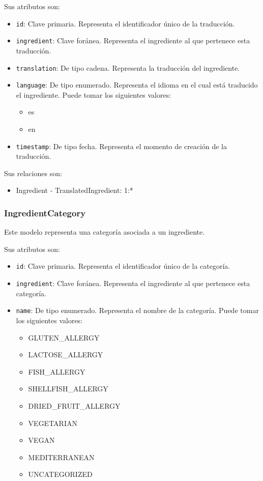 Sus atributos son:
\begin{itemize}
\item \texttt{id}: Clave primaria. Representa el identificador único de la
  traducción.
\item \texttt{ingredient}: Clave foránea. Representa el ingrediente al que
  pertenece esta traducción.
\item \texttt{translation}: De tipo cadena. Representa la traducción del
  ingrediente.
\item \texttt{language}: De tipo enumerado. Representa el idioma en el cual está
  traducido el ingrediente. Puede tomar los siguientes valores:
  \begin{itemize}
  \item es
  \item en
  \end{itemize}
\item \texttt{timestamp}: De tipo fecha. Representa el momento de creación de la
  traducción.
\end{itemize}

Sus relaciones son:
\begin{itemize}
\item Ingredient - TranslatedIngredient: 1:*
\end{itemize}


\subsubsection{IngredientCategory}

Este modelo representa una categoría asociada a un ingrediente.

Sus atributos son:
\begin{itemize}
\item \texttt{id}: Clave primaria. Representa el identificador único de la
  categoría.
\item \texttt{ingredient}: Clave foránea. Representa el ingrediente al que
  pertenece esta categoría.
\item \texttt{name}: De tipo enumerado. Representa el nombre de la categoría.
  Puede tomar los siguientes valores:
  \begin{itemize}
  \item GLUTEN\_ALLERGY
  \item LACTOSE\_ALLERGY
  \item FISH\_ALLERGY
  \item SHELLFISH\_ALLERGY
  \item DRIED\_FRUIT\_ALLERGY
  \item VEGETARIAN
  \item VEGAN
  \item MEDITERRANEAN
  \item UNCATEGORIZED
  \end{itemize}
\end{itemize}

